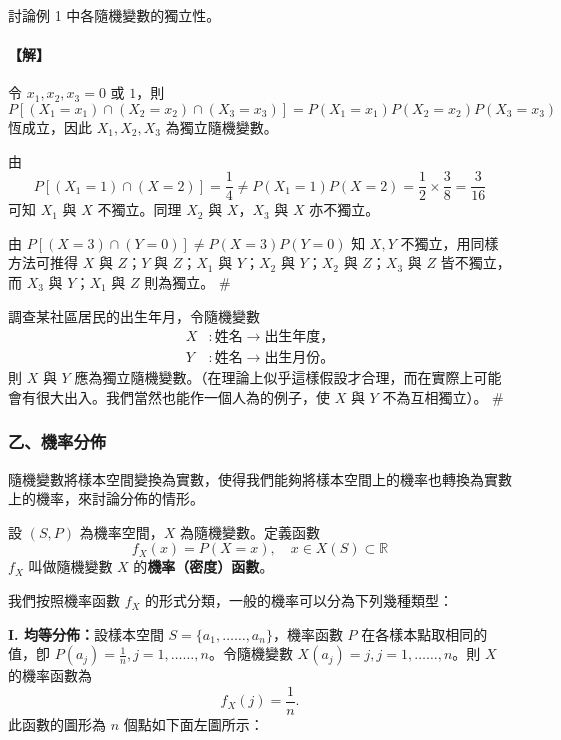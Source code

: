\medskip
\begin{example}\label{ex:b5s-5-4}
討論例 1 中各隨機變數的獨立性。
\end{example}
\paragraph{【解】}
令 $x_1, x_2, x_3 = 0$ 或 $1$，則
\[
P[(X_1 = x_1) \cap (X_2 = x_2) \cap (X_3 = x_3)] = P(X_1 = x_1) P(X_2 = x_2) P(X_3 = x_3)
\]
恆成立，因此 $X_1, X_2, X_3$ 為獨立隨機變數。

由
\[
P[(X_1 = 1) \cap (X = 2)] = \frac{1}{4} \ne P(X_1 = 1) P(X = 2) = \frac{1}{2} \times \frac{3}{8} = \frac{3}{16}
\]
可知 $X_1$ 與 $X$ 不獨立。同理 $X_2$ 與 $X$，$X_3$ 與 $X$ 亦不獨立。

由 $P[(X = 3) \cap (Y = 0)] \ne P(X = 3) P(Y = 0)$ 知 $X, Y$ 不獨立，用同樣方法可推得 $X$ 與 $Z$；$Y$ 與 $Z$；$X_1$ 與 $Y$；$X_2$ 與 $Y$；$X_2$ 與 $Z$；$X_3$ 與 $Z$ 皆不獨立，而 $X_3$ 與 $Y$；$X_1$ 與 $Z$ 則為獨立。 \hfill $\#$

\medskip
\begin{example}\label{ex:b5s-5-5}
調查某社區居民的出生年月，令隨機變數
\begin{align*}
X &\colon \text{姓名} \longrightarrow \text{出生年度，} \\
Y &\colon \text{姓名} \longrightarrow \text{出生月份。}
\end{align*}
則 $X$ 與 $Y$ 應為獨立隨機變數。（在理論上似乎這樣假設才合理，而在實際上可能會有很大出入。我們當然也能作一個人為的例子，使 $X$ 與 $Y$ 不為互相獨立）。 \hfill $\#$
\end{example}

\subsubsection*{乙、機率分佈}

隨機變數將樣本空間變換為實數，使得我們能夠將樣本空間上的機率也轉換為實數上的機率，來討論分佈的情形。

\medskip
\begin{definition*}
設 $(S, P)$ 為機率空間，$X$ 為隨機變數。定義函數
\[
f_X(x) = P(X = x), \quad x \in X(S) \subset \mathbb{R}
\]
$f_X$ 叫做隨機變數 $X$ 的\textbf{機率（密度）函數}。
\end{definition*}

我們按照機率函數 $f_X$ 的形式分類，一般的機率可以分為下列幾種類型：

\medskip
\noindent\textbf{I. 均等分佈：}設樣本空間 $S = \{a_1, \dots\dots, a_n\}$，機率函數 $P$ 在各樣本點取相同的值，卽 $P(a_j) = \frac{1}{n}, j = 1, \dots\dots, n$。令隨機變數 $X(a_j) = j, j = 1, \dots\dots, n$。則 $X$ 的機率函數為
\[
f_X(j) = \frac{1}{n}.
\]
此函數的圖形為 $n$ 個點如下面左圖所示：

